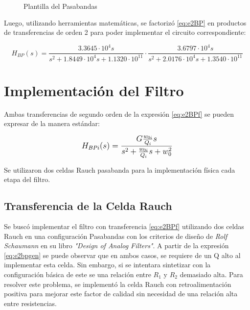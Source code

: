 \begin{figure}[ht]
\begin{center}

\end{center}
\caption{Plantilla del Pasabandas}
\label{fig:e2template}
\end{figure}

Luego, utilizando herramientas matemáticas, se factorizó \eqref{eq:e2BP} en productos de transferencias de orden 2 para poder implementar el circuito correspondiente:

\begin{equation}
H_{BP}(s)=\frac{3.3645\cdot 10^4s}{s^2 + 1.8449\cdot10^4 s + 1.1320\cdot10^{11}} \cdot \frac{3.6797\cdot 10^4s}{s^2 + 2.0176\cdot10^4 s + 1.3540\cdot10^{11}}
\label{eq:e2BPf}
\end{equation}

\section{Implementación del Filtro}

Ambas transferencias de segundo orden de la expresión \eqref{eq:e2BPf} se pueden expresar de la manera estándar:

\begin{equation}
\mathlarger{
H_{BPi} (s) = \frac{ G \frac{w_{0i}}{Q_i}s }{s^2+ \frac{w_{0i}}{Q_i}s+w_0^2}
}
\label{eq:e2bpgen}
\end{equation}

Se utilizaron dos celdas Rauch pasabanda para la implementación física cada etapa del filtro.

\subsection{Transferencia de la Celda Rauch}

\begin{figure}[ht]
\begin{center}

\label{fig:e2cell}
\end{center}
\end{figure}

Se buscó implementar el filtro con transferencia \eqref{eq:e2BPf} utilizando dos celdas Rauch en una configuración Pasabandas con los criterios de diseño de \textit{Rolf Schaumann} en su libro \textit{"Design of Analog Filters"}. A partir de la expresión \eqref{eq:e2bpgen} se puede observar que en ambos casos, se requiere de un Q alto al implementar esta celda. Sin embargo, si se intentara sintetizar con la configuración básica de este se una relación entre $R_1$ y $R_2$ demasiado alta. Para resolver este problema, se implementó la celda Rauch con retroalimentación positiva para mejorar este factor de calidad sin necesidad de una relación alta entre resistencias.

